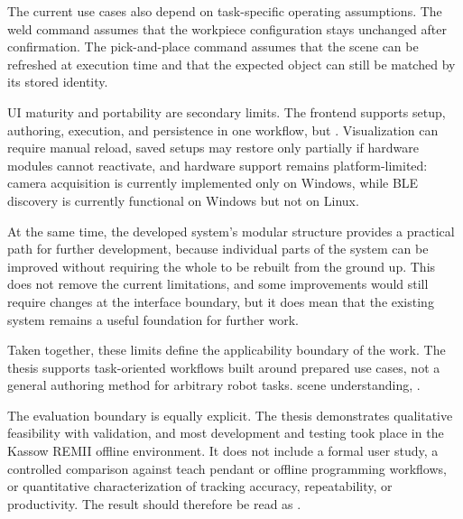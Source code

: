The current use cases also depend on task-specific operating assumptions. The weld command assumes that the workpiece configuration stays unchanged after confirmation. The pick-and-place command assumes that the scene can be refreshed at execution time and that the expected object can still be matched by its stored identity.

UI maturity and portability are secondary limits. The frontend \DIFdelbegin {}\DIFdelend supports setup, authoring, execution, and persistence in one workflow, but \DIFdelbegin {}\DIFdelend \DIFaddbegin {}\DIFaddend . Visualization can require manual reload, saved setups may restore only partially if hardware modules cannot reactivate, and hardware support remains platform-limited: camera acquisition is currently implemented only on Windows, while BLE discovery is currently functional on Windows but not on Linux.

At the same time, the developed system's modular structure provides a practical path for further development, because individual parts of the system can be improved without requiring the whole \DIFdelbegin {}\DIFdelend \DIFaddbegin {}\DIFaddend to be rebuilt from the ground up. This does not remove the current limitations, and some improvements would still require changes at the interface boundary, but it does mean that the existing system remains a useful foundation for further work.

Taken together, these limits define the applicability boundary of the work. The thesis supports \DIFdelbegin {}\DIFdelend task-oriented workflows built around prepared use cases, not a general authoring method for arbitrary robot tasks. \DIFdelbegin {}\DIFdelend \DIFaddbegin {}\DIFaddend scene understanding, \DIFdelbegin {}\DIFdelend \DIFaddbegin {}\DIFaddend .

The evaluation boundary is equally explicit. The thesis demonstrates qualitative feasibility with \DIFdelbegin {}\DIFdelend \DIFaddbegin {}\DIFaddend validation, and most development and testing took place in the Kassow REMII offline environment. It does not include a formal user study, a controlled comparison against teach pendant or offline programming workflows, or quantitative characterization of tracking accuracy, repeatability, or productivity. The result should therefore be read as \DIFdelbegin {}\DIFdelend \DIFaddbegin {}\DIFaddend .
